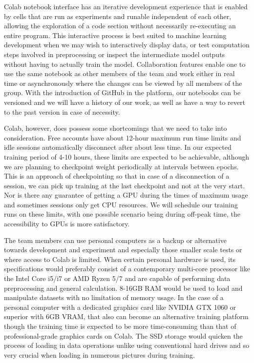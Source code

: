 \documentclass[12pt, openany]{report}
\begin{document}
Colab notebook interface has an iterative development experience that is enabled by cells that are run as experiments and runable independent of each other, allowing the exploration of a code section without necessarily re-executing an entire program. This interactive process is best suited to machine learning development when we may wish to interactively display data, or test computation steps involved in preprocessing or inspect the intermediate model outputs without having to actually train the model. Collaboration features enable one to use the same notebook as other members of the team and work either in real time or asynchronously where the changes can be viewed by all members of the group. With the introduction of GitHub in the platform, our notebooks can be versioned and we will have a history of our work, as well as have a way to revert to the past version in case of necessity.

Colab, however, does possess some shortcomings that we need to take into consideration. Free accounts have about 12-hour maximum run time limits and idle sessions automatically disconnect after about less time. In our expected training period of 4-10 hours, these limits are expected to be achievable, although we are planning to checkpoint weight periodically at intervals between epochs. This is an approach of checkpointing so that in case of a disconnection of a session, we can pick up training at the last checkpoint and not at the very start. Nor is there any guarantee of getting a GPU during the times of maximum usage and sometimes sessions only get CPU resources. We will schedule our training runs on these limits, with one possible scenario being during off-peak time, the accessibility to GPUs is more satisfactory.

The team members can use personal computers as a backup or alternative towards development and experiment and especially those smaller scale tests or where access to Colab is limited. When certain personal hardware is used, its specifications would preferably consist of a contemporary multi-core processor like the Intel Core i5/i7 or AMD Ryzen 5/7 and are capable of performing data preprocessing and general calculation. 8-16GB RAM would be used to load and manipulate datasets with no limitation of memory usage. In the case of a personal computer with a dedicated graphics card like NVIDIA GTX 1060 or superior with 6GB VRAM, that also can become an alternative training platform though the training time is expected to be more time-consuming than that of professional-grade graphics cards on Colab. The SSD storage would quicken the process of loading in data operations unlike using conventional hard drives and so very crucial when loading in numerous pictures during training.
\end{document}
